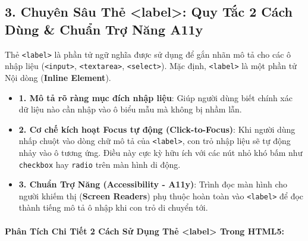 \documentclass[11pt,oneside]{book}
\newcommand{\codeinline}[1]{\textcolor{accentOrange}{\texttt{#1}}}
\newcommand{\term}[1]{\textbf{\textcolor{primaryBlue}{#1}}}
\begin{document}
\subsection{3. Chuyên Sâu Thẻ <label>: Quy Tắc 2 Cách Dùng \& Chuẩn Trợ Năng A11y}

Thẻ \codeinline{<label>} là phần tử ngữ nghĩa được sử dụng để gắn nhãn mô tả cho các ô nhập liệu (\codeinline{<input>}, \codeinline{<textarea>}, \codeinline{<select>}). Mặc định, \codeinline{<label>} là một phần tử Nội dòng (\term{Inline Element}).

\begin{conceptBox}
\begin{itemize}[leftmargin=1.5em, itemsep=4pt, parsep=0pt]
    \item \textbf{1. Mô tả rõ ràng mục đích nhập liệu}: Giúp người dùng biết chính xác dữ liệu nào cần nhập vào ô biểu mẫu mà không bị nhầm lẫn.
    \item \textbf{2. Cơ chế kích hoạt Focus tự động (\term{Click-to-Focus})}: Khi người dùng nhấp chuột vào dòng chữ mô tả của \codeinline{<label>}, con trỏ nhập liệu sẽ tự động nhảy vào ô tương ứng. Điều này cực kỳ hữu ích với các nút nhỏ khó bấm như \codeinline{checkbox} hay \codeinline{radio} trên màn hình di động.
    \item \textbf{3. Chuẩn Trợ Năng (\term{Accessibility - A11y})}: Trình đọc màn hình cho người khiếm thị (\term{Screen Readers}) phụ thuộc hoàn toàn vào \codeinline{<label>} để đọc thành tiếng mô tả ô nhập khi con trỏ di chuyển tới.
\end{itemize}
\end{conceptBox}

\paragraph{Phân Tích Chi Tiết 2 Cách Sử Dụng Thẻ <label> Trong HTML5:}
\end{document}
